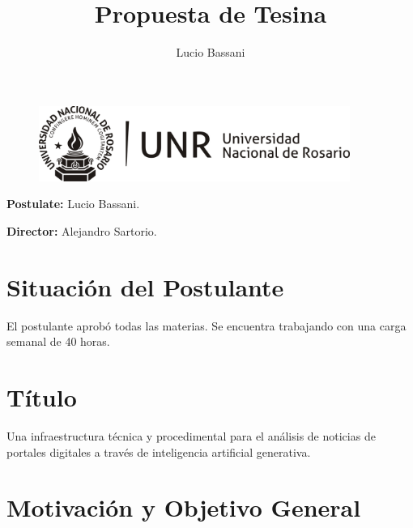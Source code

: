 \documentclass[12pt]{article}
\title{Propuesta de Tesina}
\begin{document}
\author{Lucio Bassani}

\maketitle

\begin{figure}[h]
\centering
\includegraphics[width=4in]{LOGO-UNR-NEGRO.png}
\end{figure}

\textbf{Postulate:} Lucio Bassani.

\textbf{Director:} Alejandro Sartorio.



\section{Situación del Postulante}
El postulante aprobó todas las materias. Se encuentra trabajando con una carga semanal de 40 horas.

\section{Título}
Una infraestructura técnica y procedimental para el análisis de noticias de portales digitales a través de inteligencia artificial generativa.



\section{Motivación y Objetivo General}\label{sec:Moti_O_G}

\end{document}
